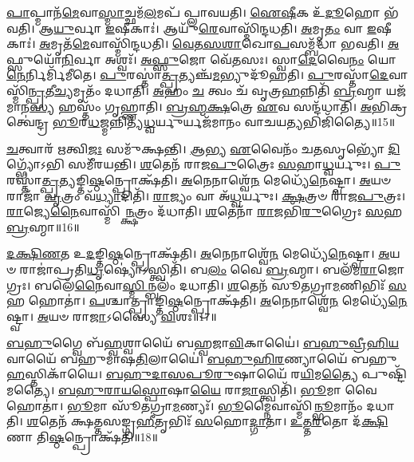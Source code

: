 \-\ul{𑌪𑌾}\-𑌪𑍍𑌮𑌾𑌨᳴\-\ul{𑌮𑍇}\-𑌵𑌾\-\ul{𑌸𑍍𑌮𑌾}\-𑌚𑍍𑌛𑌮᳴\-\ul{𑌲}\-𑌮𑌪᳴ 𑌪𑍍𑌲𑌾𑌵𑌯𑌤𑌿।
\-\ul{𑌐}\-\-\ul{𑌷𑍀}\-𑌕 𑌉᳴\-\ul{𑌦𑍂}\-𑌹𑍋 𑌭᳴𑌵𑌤𑌿।
𑌆\-\ul{𑌯𑍁}\-𑌰𑍍𑌵𑌾 \ul{𑌇}\-𑌷𑍀𑌕𑌾𑌃॑।
𑌆𑌯𑍁᳴\-\ul{𑌰𑍇}\-𑌵𑌾𑌸𑍍𑌮𑌿᳴𑌨𑍍𑌦𑌧𑌤𑌿।
\-\ul{𑌅}\-𑌮𑍃\-\ul{𑌤𑌂} 𑌵𑌾 \ul{𑌇}\-𑌷𑍀𑌕𑌾𑌃॑।
\-\ul{𑌅}\-𑌮𑍃𑌤᳴\-\ul{𑌮𑍇}\-𑌵𑌾𑌸𑍍𑌮𑌿᳴𑌨𑍍𑌦𑌧𑌤𑌿।
\-\ul{𑌵𑍇}\-\-\ul{𑌤}\-\-\ul{𑌸}\-\-\ul{𑌶𑌾}\-𑌖𑍋\-\ul{𑌪}\-𑌸𑌮𑍍𑌬᳴𑌦𑍍𑌧𑌾 𑌭𑌵𑌤𑌿।
\-\ul{𑌅}\-𑌫𑍍𑌸𑍁𑌯𑍋᳴\-\ul{𑌨𑌿}\-𑌰𑍍𑌵𑌾 𑌅𑌶𑍍𑌵𑌃᳴।
\-\ul{𑌅}\-\-\ul{𑌫𑍍𑌸𑍁}\-𑌜𑍋 𑌵𑍇᳴\-\ul{𑌤}\-𑌸𑌃।
𑌸𑍍𑌵𑌾\-\ul{𑌦𑍇}\-𑌵𑍈\-\ul{𑌨𑌂} 𑌯𑍋\-\ul{𑌨𑍇}\-𑌰𑍍𑌨𑌿𑌰𑍍𑌮𑌿᳴𑌮𑍀𑌤𑍇।
\-\ul{𑌪𑍁}\-𑌰𑌸𑍍𑌤𑌾॑\-\ul{𑌤𑍍𑌪𑍍𑌰}\-𑌤𑍍𑌯𑌞𑍍𑌚᳴\-\ul{𑌮}\-𑌭𑍍𑌯𑍁𑌦𑍂᳴𑌹𑌤𑌿।
\-\ul{𑌪𑍁}\-𑌰𑌸𑍍𑌤𑌾᳴\-\ul{𑌦𑍇}\-𑌵𑌾𑌸𑍍𑌮𑌿᳴\-\ul{𑌨𑍍𑌪𑍍𑌰}\-𑌤𑍀\-\ul{𑌚𑍍𑌯}\-𑌮𑍃𑌤𑌂᳴ 𑌦𑌧𑌾𑌤𑌿।
\-\ul{𑌅}\-𑌹𑌂 \ul{𑌚} 𑌤𑍍𑌵𑌂 𑌚᳴ 𑌵𑍃𑌤𑍍𑌰\-\ul{𑌹}\-𑌨𑍍𑌨𑌿𑌤𑌿᳴ \ul{𑌬𑍍𑌰}\-𑌹𑍍𑌮𑌾 𑌯𑌜᳴𑌮𑌾𑌨\-\ul{𑌸𑍍𑌯} 𑌹𑌸𑍍𑌤𑌂᳴ 𑌗𑍃𑌹𑍍𑌣𑌾𑌤𑌿।
\-\ul{𑌬𑍍𑌰}\-\-\ul{𑌹𑍍𑌮}\-\-\ul{𑌕𑍍𑌷}\-𑌤𑍍𑌰𑍇 \ul{𑌏}\-𑌵 𑌸𑌨𑍍𑌦᳴𑌧𑌾𑌤𑌿।
\-\ul{𑌅}\-𑌭𑌿𑌕𑍍𑌰𑌤𑍍𑌵𑍇॑𑌨𑍍𑌦𑍍𑌰 \ul{𑌭𑍂}\-𑌰\-\ul{𑌧}\-𑌜𑍍𑌮𑌨𑍍𑌨𑌿𑌤𑍍𑌯᳴\-\ul{𑌧𑍍𑌵}\-𑌰𑍍𑌯𑍁𑌰𑍍𑌯𑌜᳴𑌮𑌾𑌨𑌂 𑌵𑌾𑌚𑌯\-\ul{𑌤𑍍𑌯}\-𑌭𑌿𑌜𑌿᳴𑌤𑍍𑌯𑍈॥15॥\anuvakamend[\-\ul{𑌭}\-\-\ul{𑌵}\-\-\ul{𑌤𑌿} \ul{𑌪𑍍𑌲𑌾}\-\-\ul{𑌵}\-\-\ul{𑌯}\-\-\ul{𑌤𑌿} \ul{𑌮𑌿}\-\-\ul{𑌮𑍀}\-\-\ul{𑌤𑍇} 𑌪𑌞𑍍𑌚᳴ 𑌚]

\-\ul{𑌚}\-𑌤𑍍𑌵𑌾𑌰᳴ \ul{𑌋}\-𑌤𑍍𑌵𑌿\-\ul{𑌜𑌃} 𑌸𑌮𑍁᳴𑌕𑍍𑌷𑌨𑍍𑌤𑌿।
\-\ul{𑌆}\-𑌭𑍍𑌯 \ul{𑌏}\-𑌵𑍈𑌨𑌂᳴ 𑌚\-\ul{𑌤}\-𑌸𑍃𑌭𑍍𑌯𑍋᳴ \ul{𑌦𑌿}\-𑌗𑍍𑌭𑍍𑌯𑍋᳴𑌽𑌭𑌿 𑌸𑌮𑍀᳴𑌰𑌯𑌨𑍍𑌤𑌿।
\-\ul{𑌶}\-𑌤𑍇𑌨᳴ 𑌰𑌾𑌜\-\ul{𑌪𑍁}\-𑌤𑍍𑌰𑍈𑌃 \ul{𑌸}\-𑌹𑌾\-\ul{𑌧𑍍𑌵}\-𑌰𑍍𑌯𑍁𑌃।
\-\ul{𑌪𑍁}\-𑌰𑌸𑍍𑌤𑌾॑\-\ul{𑌤𑍍𑌪𑍍𑌰}\-𑌤𑍍𑌯𑌙𑍍𑌤𑌿\-\ul{𑌷𑍍𑌠}\-𑌨𑍍𑌪𑍍𑌰𑍋𑌕𑍍𑌷᳴𑌤𑌿।
\-\ul{𑌅}\-𑌨𑍇𑌨𑌾𑌶𑍍𑌵𑍇᳴\-\ul{𑌨} 𑌮𑍇𑌧𑍍𑌯𑍇᳴\-\ul{𑌨𑍇}\-𑌷𑍍𑌟𑍍𑌵𑌾।
\-\ul{𑌅}\-𑌯𑍞 𑌰𑌾𑌜𑌾᳴ \ul{𑌵𑍃}\-𑌤𑍍𑌰𑌂 𑌵᳴\-\ul{𑌧𑍍𑌯𑌾}\-𑌦𑌿𑌤𑌿᳴।
\-\ul{𑌰𑌾}\-𑌜𑍍𑌯𑌂 𑌵𑌾 𑌅᳴\-\ul{𑌧𑍍𑌵}\-𑌰𑍍𑌯𑍁𑌃।
\-\ul{𑌕𑍍𑌷}\-𑌤𑍍𑌰𑍞 𑌰𑌾᳴𑌜\-\ul{𑌪𑍁}\-𑌤𑍍𑌰𑌃।
\-\ul{𑌰𑌾}\-𑌜𑍍𑌯𑍇\-\-\ul{𑌨𑍈}\-𑌵𑌾𑌸𑍍𑌮𑌿᳴\-\ul{𑌨𑍍𑌕𑍍𑌷}\-𑌤𑍍𑌰𑌂 𑌦᳴𑌧𑌾𑌤𑌿।
\-\ul{𑌶}\-𑌤𑍇𑌨𑌾᳴ \ul{𑌰𑌾}\-𑌜𑌭𑌿᳴\-\ul{𑌰𑍁}\-𑌗𑍍𑌰𑍈𑌃 \ul{𑌸}\-𑌹 \ul{𑌬𑍍𑌰}\-𑌹𑍍𑌮𑌾॥16॥

\-\ul{𑌦}\-\-\ul{𑌕𑍍𑌷𑌿}\-\-\ul{𑌣}\-𑌤 𑌉\-\ul{𑌦}\-𑌙𑍍𑌤𑌿\-\ul{𑌷𑍍𑌠}\-𑌨𑍍𑌪𑍍𑌰𑍋𑌕𑍍𑌷᳴𑌤𑌿।
\-\ul{𑌅}\-𑌨𑍇𑌨𑌾𑌶𑍍𑌵𑍇᳴\-\ul{𑌨} 𑌮𑍇𑌧𑍍𑌯𑍇᳴\-\ul{𑌨𑍇}\-𑌷𑍍𑌟𑍍𑌵𑌾।
\-\ul{𑌅}\-𑌯𑍞 𑌰𑌾𑌜𑌾॑𑌪𑍍𑌰𑌤𑌿\-\ul{𑌧𑍃}\-𑌷𑍍𑌯𑍋॑\-𑌽𑌸𑍍𑌤𑍍𑌵𑌿𑌤𑌿᳴।
𑌬\-\ul{𑌲𑌂} 𑌵𑍈 \ul{𑌬𑍍𑌰}\-𑌹𑍍𑌮𑌾।
𑌬𑌲᳴𑌮\-\ul{𑌰𑌾}\-𑌜𑍋𑌗𑍍𑌰𑌃।
𑌬𑌲𑍇᳴\-\ul{𑌨𑍈}\-𑌵𑌾\-\ul{𑌸𑍍𑌮𑌿}\-𑌨𑍍𑌬𑌲𑌂᳴ 𑌦𑌧𑌾𑌤𑌿।
\-\ul{𑌶}\-𑌤𑍇𑌨᳴ 𑌸𑍂𑌤𑌗𑍍𑌰𑌾\-\ul{𑌮}\-𑌣𑌿𑌭𑌿𑌃᳴ \ul{𑌸}\-𑌹 𑌹𑍋𑌤𑌾॑।
\-\ul{𑌪}\-𑌶𑍍𑌚𑌾𑌤𑍍𑌪𑍍𑌰𑌾𑌙𑍍𑌤𑌿\-\ul{𑌷𑍍𑌠}\-𑌨𑍍𑌪𑍍𑌰𑍋𑌕𑍍𑌷᳴𑌤𑌿।
\-\ul{𑌅}\-𑌨𑍇𑌨𑌾𑌶𑍍𑌵𑍇᳴\-\ul{𑌨} 𑌮𑍇𑌧𑍍𑌯𑍇᳴\-\ul{𑌨𑍇}\-𑌷𑍍𑌟𑍍𑌵𑌾।
\-\ul{𑌅}\-𑌯𑍞 𑌰𑌾\-\ul{𑌜𑌾}\-\-𑌽𑌸𑍍𑌯𑍈 \ul{𑌵𑌿}\-𑌶𑌃॥17॥

\-\ul{𑌬}\-\-\ul{𑌹𑍁}\-𑌗𑍍𑌵𑍈 𑌬᳴\-\ul{𑌹𑍍𑌵}\-𑌶𑍍𑌵𑌾𑌯𑍈᳴ 𑌬𑌹𑍍𑌵𑌜𑌾\-\ul{𑌵𑌿}\-𑌕𑌾𑌯𑍈॑।
\-\ul{𑌬}\-\-\ul{𑌹𑍁}\-\-\ul{𑌵𑍍𑌰𑍀}\-\-\ul{𑌹𑌿}\-\-\ul{𑌯}\-𑌵𑌾𑌯𑍈᳴ 𑌬𑌹𑍁𑌮𑌾𑌷\-\-\ul{𑌤𑌿}\-𑌲𑌾𑌯𑍈॑।
\-\ul{𑌬}\-\-\ul{𑌹𑍁}\-\-\ul{𑌹𑌿}\-\-\ul{𑌰}\-𑌣𑍍𑌯𑌾𑌯𑍈᳴ 𑌬𑌹𑍁\-\ul{𑌹}\-𑌸𑍍𑌤𑌿𑌕𑌾᳴𑌯𑍈।
\-\ul{𑌬}\-\-\ul{𑌹𑍁}\-\-\ul{𑌦𑌾}\-\-\ul{𑌸}\-\-\-\ul{𑌪𑍂}\-\-\ul{𑌰𑍁}\-𑌷𑌾𑌯𑍈᳴ 𑌰\-\ul{𑌯𑌿}\-𑌮\-\ul{𑌤𑍍𑌯𑍈} 𑌪𑍁𑌷𑍍𑌟𑌿᳴𑌮𑌤𑍍𑌯𑍈।
\-\ul{𑌬}\-\-\ul{𑌹𑍁}\-\-\ul{𑌰𑌾}\-\-\ul{𑌯}\-\-\ul{𑌸𑍍𑌪𑍋}\-𑌷𑌾\-\ul{𑌯𑍈} 𑌰𑌾\-\ul{𑌜𑌾}\-𑌸𑍍𑌤𑍍𑌵𑌿𑌤𑌿᳴।
\-\ul{𑌭𑍂}\-𑌮𑌾 𑌵𑍈 𑌹𑍋𑌤𑌾॑।
\-\ul{𑌭𑍂}\-𑌮𑌾 𑌸𑍂᳴𑌤𑌗𑍍𑌰𑌾\-\ul{𑌮}\-𑌣𑍍𑌯𑌃᳴।
\-\ul{𑌭𑍂}\-𑌮𑍍𑌨𑍈𑌵𑌾𑌸𑍍𑌮𑌿᳴\-\ul{𑌨𑍍𑌭𑍂}\-𑌮𑌾𑌨𑌂᳴ 𑌦𑌧𑌾𑌤𑌿।
\-\ul{𑌶}\-𑌤𑍇𑌨᳴ 𑌕𑍍𑌷𑌤𑍍𑌤𑌸𑌙𑍍𑌗𑍍𑌰\-\ul{𑌹𑍀}\-𑌤𑍃𑌭𑌿𑌃᳴ \ul{𑌸}\-𑌹𑍋\-\ul{𑌦𑍍𑌗𑌾}\-𑌤𑌾।
\-\ul{𑌉}\-\-\ul{𑌤𑍍𑌤}\-\-\ul{𑌰}\-𑌤𑍋 𑌦᳴\-\ul{𑌕𑍍𑌷𑌿}\-𑌣𑌾 𑌤𑌿\-\ul{𑌷𑍍𑌠}\-𑌨𑍍𑌪𑍍𑌰𑍋𑌕𑍍𑌷᳴𑌤𑌿॥18॥

